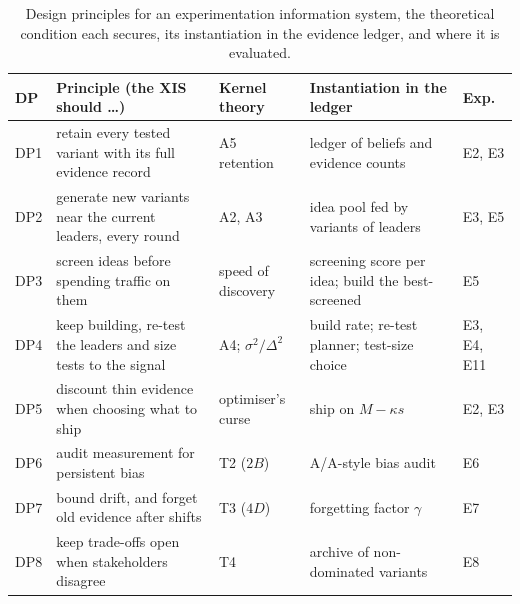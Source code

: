 \documentclass[preprint,12pt,authoryear]{elsarticle}
\theoremstyle{definition}
\begin{document}
\begin{table}[!tbp]
\caption{Design principles for an experimentation information system, the theoretical condition each secures, its instantiation in the evidence ledger, and where it is evaluated.}
\label{tab:dp}
\centering\footnotesize
\begin{tabularx}{\textwidth}{@{}P{0.75cm}LP{2.0cm}LP{0.95cm}@{}}
\toprule
DP & Principle (the XIS should \ldots) & Kernel theory & Instantiation in the ledger & Exp.\\
\midrule
DP1 & retain every tested variant with its full evidence record & A5 retention & ledger of beliefs and evidence counts & E2, E3\\
DP2 & generate new variants near the current leaders, every round & A2, A3 & idea pool fed by variants of leaders & E3, E5\\
DP3 & screen ideas before spending traffic on them & speed of discovery & screening score per idea; build the best-screened & E5\\
DP4 & keep building, re-test the leaders and size tests to the signal & A4; $\sigma^2/\Delta^2$ & build rate; re-test planner; test-size choice & E3, E4, E11\\
DP5 & discount thin evidence when choosing what to ship & optimiser's curse & ship on $M-\kappa s$ & E2, E3\\
DP6 & audit measurement for persistent bias & T2 ($2B$) & A/A-style bias audit & E6\\
DP7 & bound drift, and forget old evidence after shifts & T3 ($4D$) & forgetting factor $\gamma$ & E7\\
DP8 & keep trade-offs open when stakeholders disagree & T4 & archive of non-dominated variants & E8\\
\bottomrule
\end{tabularx}
\end{table}
\end{document}
